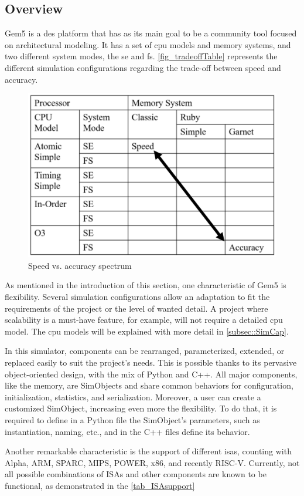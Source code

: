 \subsection{Overview}

Gem5 is a \gls{des} platform that has as its main goal to be a community tool focused on architectural modeling. It has a set of \gls{cpu} 
models and memory systems, and two different system modes, the \gls{se} and \gls{fs}. \autoref{fig_tradeoffTable} represents the different 
simulation configurations regarding the trade-off between speed and accuracy. 

\begin{figure}[H]
	\centering
 	\includegraphics[width=0.6\linewidth]{Images/tradeoffTable.png}
 	\caption{Speed vs. accuracy spectrum \cite{TheGem5Simulator}}
	 \label{fig_tradeoffTable}
\end{figure}

As mentioned in the introduction of this section, one characteristic of Gem5 is flexibility. Several simulation configurations allow an 
adaptation to fit the requirements of the project or the level of wanted detail. A project where scalability is a must-have feature, for 
example, will not require a detailed \gls{cpu} model. The \gls{cpu} models will be explained with more detail in \autoref{subsec::SimCap}. 

In this simulator, components can be rearranged, parameterized, extended, or replaced easily to suit the project's needs. This is possible 
thanks to its pervasive object-oriented design, with the mix of Python and C++. All major components, like the memory, are SimObjects and 
share common behaviors for configuration, initialization, statistics, and serialization. Moreover, a user can create a customized SimObject, 
increasing even more the flexibility. To do that, it is required to define in a Python file the SimObject’s parameters, such as instantiation, 
naming, etc., and in the C++ files define its behavior.

Another remarkable characteristic is the support of different \glspl{isa}, counting with Alpha, ARM, SPARC, MIPS, POWER, x86, and recently 
RISC-V. Currently, not all possible combinations of ISAs and other components are known to be functional, as demonstrated in the 
\autoref{tab_ISAsupport}

